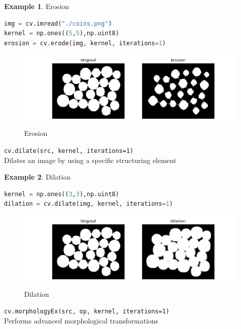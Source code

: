 \documentclass{article}
\theoremstyle{definition}
\newtheorem{ex}{Example}[subsection]
\theoremstyle{remark}
\newcommand{\func}[2]{\noindent\lstinline{#1}\\#2}
\begin{document}
\begin{ex} Erosion

\begin{lstlisting}[language=Python]
img = cv.imread("./coins.png")
kernel = np.ones((5,5),np.uint8)
erosion = cv.erode(img, kernel, iterations=1)
\end{lstlisting}
\begin{figure}[H]
    \centering
    \includegraphics[width=\textwidth]{ocv_erosion}
    \caption{Erosion}
    \label{fig:ocv_ero}
\end{figure}
\end{ex}


\func{cv.dilate(src, kernel, iterations=1)}{Dilates an image by using a specific structuring element}


\begin{ex} Dilation
\begin{lstlisting}[language=Python]
kernel = np.ones((3,3),np.uint8)
dilation = cv.dilate(img, kernel, iterations=1)
\end{lstlisting}
\begin{figure}[H]
    \centering
    \includegraphics[width=\textwidth]{ocv_dilation}
    \caption{Dilation}
    \label{fig:ocv_dilation}
\end{figure}
\end{ex}


\func{cv.morphologyEx(src, op, kernel, iterations=1)}{Performs advanced morphological transformations}
\end{document}
